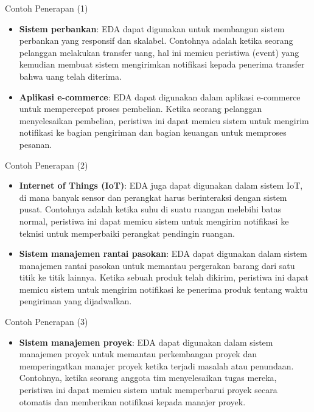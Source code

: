\documentclass[aspectratio=169, table]{beamer}
\begin{document}
\begin{frame}{Contoh Penerapan (1)}
    \begin{itemize}
        \item \textbf{Sistem perbankan}: EDA dapat digunakan untuk membangun sistem perbankan yang responsif dan skalabel. Contohnya adalah ketika seorang pelanggan melakukan transfer uang, hal ini memicu peristiwa (event) yang kemudian membuat sistem mengirimkan notifikasi kepada penerima transfer bahwa uang telah diterima.
        \item \textbf{Aplikasi e-commerce}: EDA dapat digunakan dalam aplikasi e-commerce untuk mempercepat proses pembelian. Ketika seorang pelanggan menyelesaikan pembelian, peristiwa ini dapat memicu sistem untuk mengirim notifikasi ke bagian pengiriman dan bagian keuangan untuk memproses pesanan.

    \end{itemize}
\end{frame}
\begin{frame}{Contoh Penerapan (2)}
    \begin{itemize}

        \item \textbf{Internet of Things (IoT)}: EDA juga dapat digunakan dalam sistem IoT, di mana banyak sensor dan perangkat harus berinteraksi dengan sistem pusat. Contohnya adalah ketika suhu di suatu ruangan melebihi batas normal, peristiwa ini dapat memicu sistem untuk mengirim notifikasi ke teknisi untuk memperbaiki perangkat pendingin ruangan.
        \item \textbf{Sistem manajemen rantai pasokan}: EDA dapat digunakan dalam sistem manajemen rantai pasokan untuk memantau pergerakan barang dari satu titik ke titik lainnya. Ketika sebuah produk telah dikirim, peristiwa ini dapat memicu sistem untuk mengirim notifikasi ke penerima produk tentang waktu pengiriman yang dijadwalkan.

    \end{itemize}
\end{frame}

\begin{frame}{Contoh Penerapan (3)}
    \begin{itemize}

        \item \textbf{Sistem manajemen proyek}: EDA dapat digunakan dalam sistem manajemen proyek untuk memantau perkembangan proyek dan memperingatkan manajer proyek ketika terjadi masalah atau penundaan. Contohnya, ketika seorang anggota tim menyelesaikan tugas mereka, peristiwa ini dapat memicu sistem untuk memperbarui proyek secara otomatis dan memberikan notifikasi kepada manajer proyek.

    \end{itemize}
\end{frame}
\end{document}
